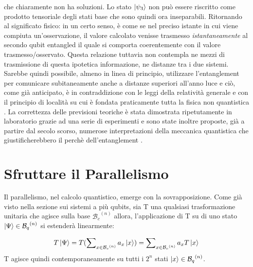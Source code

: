 \documentclass[12pt,a4paper,openright]{report}
\begin{document}
che chiaramente non ha soluzioni. Lo stato $\ket{\psi_3}$ non può essere riscritto come prodotto tensoriale degli stati base che sono quindi ora inseparabili.
Ritornando al significato fisico: in un certo senso, è come se nel preciso istante in cui viene compiuta un'osservazione, il valore calcolato venisse trasmesso \emph{istantaneamente} al secondo qubit entangled il quale si comporta coerentemente
con il valore trasmesso/osservato. Questa relazione tuttavia non contempla ne mezzi di trasmissione di questa ipotetica informazione, ne distanze tra i due sistemi. Sarebbe quindi possibile, almeno in linea di
principio, utilizzare l'entanglement per comunicare subitaneamente anche a distanze superiori all'anno luce e ciò, come già anticipato, è in contraddizione con le leggi della relatività generale e con il 
principio di località su cui è fondata praticamente tutta la fisica non quantistica \cite{ref9}. La correttezza delle previsioni teoriche è stata dimostrata ripetutamente in laboratorio grazie ad una serie
di esperimenti \cite{ref10} e sono state inoltre proposte, già a partire dal secolo scorso, numerose interpretazioni della meccanica quantistica che giustificherebbero il perchè dell'entanglement \cite{ref11}.

\section{Sfruttare il Parallelismo}

Il parallelismo, nel calcolo quantistico, emerge con la sovrapposizione. Come già visto nella sezione sui sistemi a più qubits, sia T una qualsiasi trasformazione unitaria che agisce sulla base ${\mathcal{B}_c}^{(n)}$
allora, l'applicazione di T su di uno stato $\ket{\Psi}\in{{\mathcal{B}_q}^{(n)}}$ si estenderà linearmente:

\[
    T\ket{\Psi} = T(\sum\nolimits_{x \in {\mathcal{B}_c}^{(n)}} a_x \ket{x}) = \sum\nolimits_{x \in {\mathcal{B}_c}^{(n)}} a_x T\ket{x}
\]
T agisce quindi contemporaneamente su tutti i $2^n$ stati $\ket{x}\in{{\mathcal{B}_q}^{(n)}}$.

\par
\end{document}
